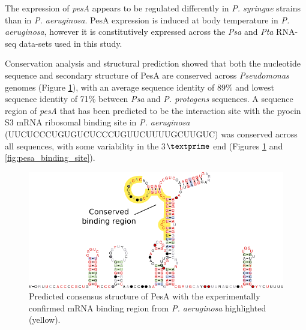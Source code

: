 The expression of \textit{pesA} appears to be regulated differently in \textit{P. syringae} strains than in \textit{P. aeruginosa}. PesA expression is induced at body temperature in \textit{P. aeruginosa}, however it is constitutively expressed across the \textit{Psa} and \textit{Pta} RNA-seq data-sets used in this study. 

Conservation analysis and structural prediction showed that both the nucleotide sequence and secondary structure of PesA are conserved across \textit{Pseudomonas} genomes (Figure \ref{fig:pesa_structure}), with an average sequence identity of 89\% and lowest sequence identity of 71\% between \textit{Psa} and \textit{P. protogens} sequences. A sequence region of \textit{pesA} that has been predicted to be the interaction site with the pyocin S3 mRNA ribosomal binding site in \textit{P. aeruginosa} (UUCUCCCUGUGUCUCCCUGUUCUUUUGCUUGUC) was conserved across all sequences, with some variability in the 3$\textprime$ end (Figures \ref{fig:pesa_structure} and \ref{fig:pesa_binding_site}). 

\begin{figure}[H]
    \centering
    \includegraphics[scale=1.8]{psa/psa_ncRNA/Pesa_binding_site.png}
    \caption[Predicted consensus structure of PesA]{Predicted consensus structure of PesA with the experimentally confirmed mRNA binding region from \textit{P. aeruginosa} highlighted (yellow).}
    \label{fig:pesa_structure}
\end{figure}

